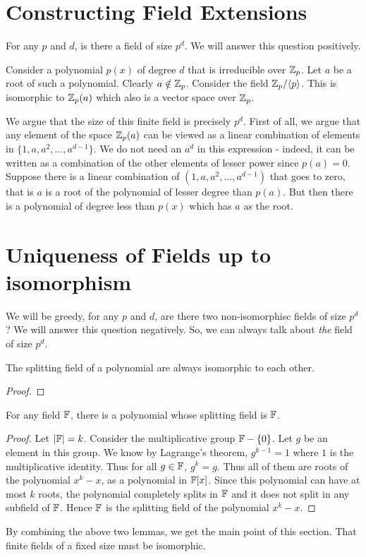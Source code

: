 \section{Constructing Field Extensions}

For any $p$ and $d$, is there a field of size $p^d$. We will answer this question positively.

Consider a polynomial $p(x)$ of degree $d$ that is irreducible over ${\mathbb{Z}}_p$. Let $a$ be a root of such a polynomial. Clearly $a \notin {\mathbb{Z}}_p$. Consider the field ${\mathbb{Z}}_p/\langle p \rangle$. This is isomorphic to ${\mathbb{Z}}_p(a)$ which also is a vector space over ${\mathbb{Z}}_p$. 

We argue that the size of this finite field is precisely $p^d$. First of all, we argue that any element of the space ${\mathbb{Z}}_p(a)$ can be viewed as a linear combination of elements in $\{1, a, a^2, \ldots, a^{d-1}\}$. We do not need an $a^d$ in this expression - indeed, it can be written as a combination of the other elements of lesser power since $p(a) = 0$. Suppose there is a linear combination of $(1, a, a^2, \ldots, a^{d-1})$ that goes to zero, that is $a$ is a root of the polynomial of lesser degree than $p(a)$. But then there is a polynomial of degree less than $p(x)$ which has $a$ as the root.

\section{Uniqueness of Fields up to isomorphism}

We will be greedy, for any $p$ and $d$, are there two non-isomorphisc fields of size $p^d$? We will answer this question negatively. So, we can always talk about {\em the} field of size $p^d$.
\begin{lemma}
The splitting field of a polynomial are always isomorphic to each other.
\end{lemma}
\begin{proof}
\end{proof}

\begin{lemma}
For any field ${\mathbb{F}}$, there is a polynomial whose splitting field is ${\mathbb{F}}$.
\end{lemma}
\begin{proof}
Let $|{\mathbb{F}}| = k$. Consider the multiplicative group ${\mathbb{F}} - \{0\}$. Let $g$ be an element in  this group. We know by Lagrange's theorem, $g^{k-1} = 1$ where $1$ is the multiplicative identity. Thus for all $g \in {\mathbb{F}}$, $g^k = g$. Thus all of them are roots of the polynomial $x^k - x$, as a polynomial in ${\mathbb{F}}[x]$. Since this polynomial can have at most $k$ roots, the polynomial completely splits in ${\mathbb{F}}$ and it does not split in any subfield of ${\mathbb{F}}$. Hence ${\mathbb{F}}$ is the splitting field of the polynomial $x^k - x$. 
\end{proof}

By combining the above two lemmas, we get the main point of this section. That finite fields of a fixed size must be isomorphic.
